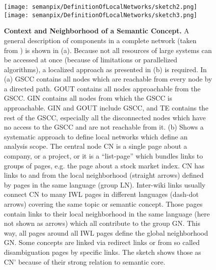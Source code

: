 \documentclass[a4paper,10pt]{scrbook}
\begin{document}
\begin{figure}[th!]
\texttt{[image: semanpix/DefinitionOfLocalNetworks/sketch2.png]}
\texttt{[image: semanpix/DefinitionOfLocalNetworks/sketch3.png]}
\caption{\textbf{Context and Neighborhood of a Semantic Concept.} A general description of components in a complete network (taken from \cite{dorogovtsev2013evolution}) is shown in (a). Because not all resources of large systems can be accessed at once (because of limitations or parallelized algorithms), a localized approach as presented in (b) is required. In (a) GSCC contains all nodes which are reachable from every node by a directed path. GOUT contains all nodes approachable from the GSCC. GIN contains all nodes from which the GSCC is approachable. GIN and GOUT include GSCC, and TE contains the rest of the GSCC, especially all the disconnected nodes which have no access to the GSCC and are not reachable from it. (b) Shows a systematic approach to define local networks which define an analysis scope. The central node CN is a single page about a company, or a project, or it is a “list-page” which bundles links to groups of pages, e.g. the page about a stock market index. CN has links to and from the local neighborhood (straight arrows) defined by pages in the same language (group LN). Inter-wiki links usually connect CN to many IWL pages in different languages (dash-dot arrows) covering the same topic or semantic concept. Those pages contain links to their local neighborhood in the same language (here not shown as arrows) which all contribute to the group GN. This way, all pages around all IWL pages define the global neighborhood GN. Some concepts are linked via redirect links or from so called disambiguation pages by specific links. The sketch shows those as CN' because of their strong relation to semantic core.}
     \label{fig1.NeighborhoodNetworks} 
     \label{fig.LocalNetworksDefineAnalysisScope} 
\end{figure}
\end{document}
